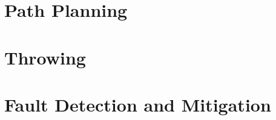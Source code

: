 \cite{4309277}

\section{Path Planning}




\section{Throwing}




\section{Fault Detection and Mitigation}



